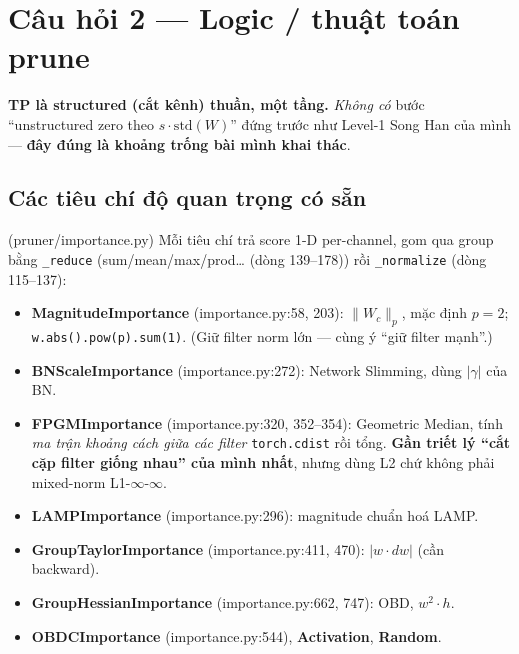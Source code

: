 \documentclass[11pt,a4paper]{article}
\newcommand{\code}[1]{\texttt{#1}}
\newcommand{\src}[1]{{\small\ttfamily(#1)}}   %
\begin{document}
\section{Câu hỏi 2 --- Logic / thuật toán prune}

\noindent\textbf{TP là structured (cắt kênh) thuần, một tầng.} \emph{Không có} bước ``unstructured
zero theo \(s\cdot\mathrm{std}(W)\)'' đứng trước như Level-1 Song Han của mình --- \textbf{đây đúng là
khoảng trống bài mình khai thác}.

\subsection{Các tiêu chí độ quan trọng có sẵn} \src{pruner/importance.py}
Mỗi tiêu chí trả score 1-D per-channel, gom qua group bằng \code{\_reduce} (sum/mean/max/prod\ldots
\src{dòng 139--178}) rồi \code{\_normalize} \src{dòng 115--137}:
\begin{itemize}
  \item \textbf{MagnitudeImportance} \src{importance.py:58, 203}: \(\lVert W_c\rVert_p\), mặc định
        \(p{=}2\); \code{w.abs().pow(p).sum(1)}. (Giữ filter norm lớn --- cùng ý ``giữ filter mạnh''.)
  \item \textbf{BNScaleImportance} \src{importance.py:272}: Network Slimming, dùng \(|\gamma|\) của BN.
  \item \textbf{FPGMImportance} \src{importance.py:320, 352--354}: Geometric Median, tính
        \emph{ma trận khoảng cách giữa các filter} \code{torch.cdist} rồi tổng. \textbf{Gần triết lý
        ``cắt cặp filter giống nhau'' của mình nhất}, nhưng dùng L2 chứ không phải mixed-norm
        L1-\(\infty\)-\(\infty\).
  \item \textbf{LAMPImportance} \src{importance.py:296}: magnitude chuẩn hoá LAMP.
  \item \textbf{GroupTaylorImportance} \src{importance.py:411, 470}: \(|w\cdot dw|\) (cần backward).
  \item \textbf{GroupHessianImportance} \src{importance.py:662, 747}: OBD, \(w^2\cdot h\).
  \item \textbf{OBDCImportance} \src{importance.py:544}, \textbf{Activation}, \textbf{Random}.
\end{itemize}
\end{document}
